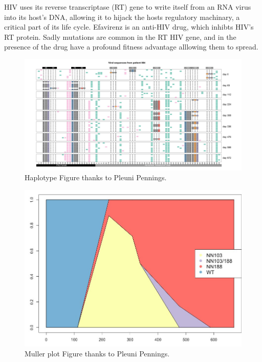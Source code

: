 HIV uses its reverse transcriptase (RT) gene to write itself from an RNA virus into its host's DNA, allowing it to hijack the hosts regulatory machinary, a critical part of its life cycle. 
Efavirenz is an anti-HIV drug, which inhibts HIV's RT protein. Sadly mutations are common in the RT HIV gene, and in the presence of the drug have a profound fitness advantage alllowing them to spread. 

\begin{figure}
\begin{center}
  \includegraphics[width =  \textwidth]{Journal_figs/recom_selection/Pleuni_HIV_interference/DdwdkVeVMAA7t-V.jpg}
\end{center}
\caption{Haplotype Figure thanks to Pleuni Pennings.} \label{fig:HIV_interference}  %
\end{figure}

\begin{figure}
\begin{center}
  \includegraphics[width = 0.8 \textwidth]{Journal_figs/recom_selection/Pleuni_HIV_interference/DdweQyxU0AA7mXe.jpg}
\end{center}
\caption{Muller plot Figure thanks to Pleuni Pennings.} \label{fig:HIV_interference_M}  %
\end{figure}


